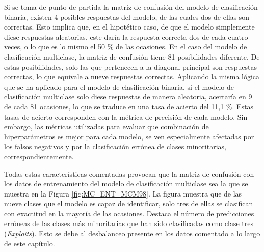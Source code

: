 \begin{enumerate}
	Si se toma de punto de partida la matriz de confusión del modelo de clasificación binaria, existen 4 posibles respuestas del modelo, de las cuales dos de ellas son correctas. Esto implica que, en el hipotético caso, de que el modelo simplemente diese respuestas aleatorias, este daría la respuesta correcta dos de cada cuatro veces, o lo que es lo mismo el 50 \% de las ocasiones. En el caso del modelo de clasificación multiclase, la matriz de confusión tiene 81 posibilidades diferente. De estas posibilidades, solo las que pertenecen a la diagonal principal son respuestas correctas, lo que equivale a nueve respuestas correctas. Aplicando la misma lógica que se ha aplicado para el modelo de clasificación binaria, si el modelo de clasificación multiclase solo diese respuestas de manera aleatoria, acertaría en 9 de cada 81 ocasiones, lo que se traduce en una tasa de acierto del 11,1 \%. Estas tasas de acierto corresponden con la métrica de precisión de cada modelo. Sin embargo, las métricas utilizadas para evaluar que combinación de hiperparámetros es mejor para cada modelo, se ven especialmente afectadas por los falsos negativos y por la clasificación errónea de clases minoritarias, correspondientemente.
\end{enumerate}

Todas estas características comentadas provocan que la matriz de confusión con los datos de entrenamiento del modelo de clasificación multiclase sea la que se muestra en la Figura \ref{fig:MC_ENT_MCM98}. La figura muestra que de las nueve clases que el modelo es capaz de identificar, solo tres de ellas se clasifican con exactitud en la mayoría de las ocasiones. Destaca el número de predicciones erróneas de las clases más minoritarias que han sido clasificadas como clase tres (\textit{Exploits}). Esto se debe al desbalanceo presente en los datos comentado a lo largo de este capítulo.

